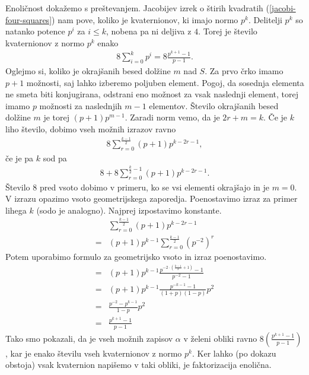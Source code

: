 \begin{dokaz}
    Enoličnost dokažemo s preštevanjem. Jacobijev izrek o štirih kvadratih (\ref{jacobi-four-squares}) nam pove, koliko je kvaternionov, ki imajo normo \(p^k\). Delitelji \(p^k\) so natanko potence \(p^i\) za \(i\leq k\), nobena pa ni deljiva z \(4\). Torej je število kvaternionov z normo \(p^k\) enako 
    \begin{align*}
        8\sum_{i=0}^k p^i = 8\frac{p^{k+1}-1}{p-1}.
    \end{align*}
    Oglejmo si, koliko je okrajšanih besed dolžine \(m\) nad \(S\). Za prvo črko imamo \(p+1\) možnosti, saj lahko izberemo poljuben element. Pogoj, da sosednja elementa ne smeta biti konjugirana, odstrani eno možnost za vsak naslednji element, torej imamo \(p\) možnosti za naslednjih \(m-1\) elementov. Število okrajšanih besed dolžine \(m\) je torej \((p+1)p^{m-1}\). Zaradi norm vemo, da je \(2r+m=k\). Če je \(k\) liho število, dobimo vseh možnih izrazov ravno
    \begin{align*}
        8\sum_{r=0}^{\frac{k-1}{2}} (p+1)p^{k-2r-1},
    \end{align*} 
    če je pa \(k\) sod pa
    \begin{align*}
        8+8\sum_{r=0}^{\frac{k}{2}-1} (p+1)p^{k-2r-1}.
    \end{align*}
    Število \(8\) pred vsoto dobimo v primeru, ko se vsi elementi okrajšajo in je \(m=0\). V izrazu opazimo vsoto geometrijskega zaporedja. Poenostavimo izraz za primer lihega \(k\) (sodo je analogno). Najprej izpostavimo konstante.
    \begin{align*}
        &\sum_{r=0}^{\frac{k-1}{2}} (p+1)p^{k-2r-1}\\
        =& (p+1)p^{k-1}\sum_{r=0}^{\frac{k-1}{2}} \left(p^{-2}\right)^r
    \end{align*}
    Potem uporabimo formulo za geometrijsko vsoto in izraz poenostavimo.
    \begin{align*}
        =& (p+1)p^{k-1} \frac{p^{-2\cdot \left(\frac{k-1}{2}+1\right)}-1}{p^{-2}-1} \\
        =& (p+1)p^{k-1} \frac{p^{-k-1}-1}{(1+p)(1-p)} p^2\\
        =& \frac{p^{-2} - p^{k-1}}{1-p} p^2\\
        =& \frac{p^{k+1} - 1}{p-1}
    \end{align*}
    Tako smo pokazali, da je vseh možnih zapisov \(\alpha\) v želeni obliki ravno \(8\left(\frac{p^{k+1}-1}{p-1}\right)\), kar je enako številu vseh kvaternionov z normo \(p^k\). Ker lahko (po dokazu obstoja) vsak kvaternion napišemo v taki obliki, je faktorizacija enolična.
\end{dokaz}
